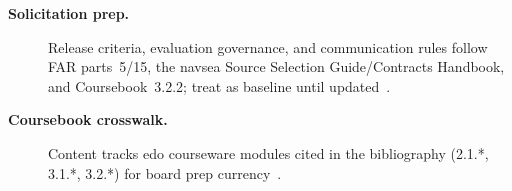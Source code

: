 \documentclass[../main.tex]{subfiles}
\begin{document}
\begin{description}
\item[\textbf{Solicitation prep.}] Release criteria, evaluation governance, and communication rules follow FAR parts~5/15, the \ac{navsea} Source Selection Guide/Contracts Handbook, and Coursebook~3.2.2; treat as baseline until updated~\autocite{FAR,NAVSEA-Source-Selection-Guide-2022,NAVSEA-Contracts-Handbook-2023,edo-3-2-2-solicitation-prep-2025}.
	\item[\textbf{Coursebook crosswalk.}] Content tracks \ac{edo} courseware modules cited in the bibliography (2.1.*, 3.1.*, 3.2.*) for board prep currency~\autocite{edo-2-1-1-command-structures-2025,edo-2-1-5-technical-authority-2025,edo-3-1-1-ppbe-2025,edo-3-1-4-budget-execution-2025,edo-3-2-1-intro-contracting-2025,edo-3-2-2-solicitation-prep-2025}.
\end{description}
\HR

\end{document}
